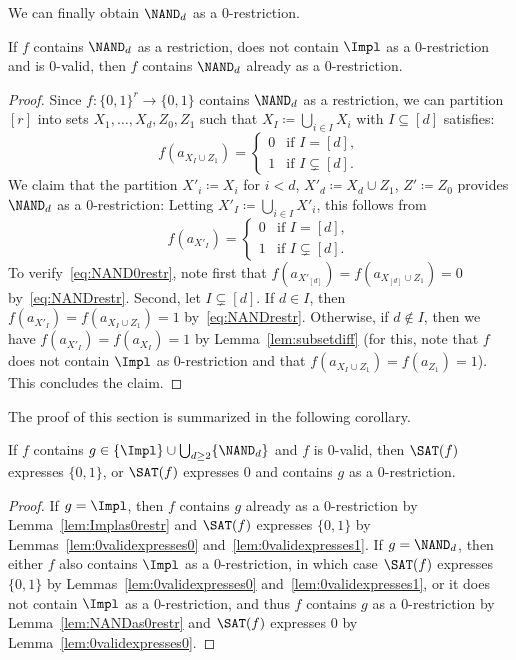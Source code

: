 %
We can finally obtain $\NAND_d$ as a $0$-restriction.
%
%
\begin{lem}\label{lem:NANDas0restr}
If $f$ contains $\NAND_d$ as a restriction, does not contain $\Impl$ as a 0-restriction and is $0$-valid, then $f$ contains $\NAND_d$ already as a $0$-restriction.
\end{lem}
\begin{proof}
%
%
%
%
%
%
%
%
%
%
%
%
%
%
%
%
%
%
%
%
%
%
%
%
%
%
%
%
%
%
%
%
%
%
%
%
%
%
%
%
%
%
%
%
Since $f:\{0,1\}^r \to \{0,1\}$ contains $\NAND_d$ as a restriction, we can partition $[r]$ into sets $X_1,\dots,X_d,Z_0,Z_1$ such that $X_I\coloneqq \bigcup_{i\in I} X_i$ with $I\subseteq [d]$ satisfies:
\begin{equation}\label{eq:NANDrestr}
f(a_{X_I \cup Z_1}) = \begin{cases} 0 & \text{if } I = [d], \\ 1 & \text{if } I \subsetneq [d]. \end{cases}
\end{equation}
%
We claim that the partition $X'_{i} \coloneqq X_i$ for $i<d$, $X'_d \coloneqq X_d \cup Z_1$, $Z'\coloneqq Z_0$ provides $\NAND_d$ as a 0-restriction: Letting $X'_I \coloneqq \bigcup_{i\in I} X'_i$, this follows from
\begin{equation}\label{eq:NAND0restr}
f(a_{X'_I}) = \begin{cases} 0 & \text{if } I = [d], \\ 1 & \text{if } I \subsetneq [d]. \end{cases}
\end{equation}
To verify~\eqref{eq:NAND0restr}, note first that $f(a_{X'_{[d]}}) = f(a_{X_{[d]}\cup Z_1}) = 0$ by~\eqref{eq:NANDrestr}. Second, let $I\subsetneq [d]$. If $d\in I$, then $f(a_{X'_I}) = f(a_{X_I\cup Z_1}) = 1$ by~\eqref{eq:NANDrestr}. Otherwise, if $d\notin I$, then we have $f(a_{X'_I}) = f(a_{X_I}) = 1$ by Lemma~\ref{lem:subsetdiff} (for this, note that $f$ does not contain $\Impl$ as 0-restriction and that $f(a_{X_I \cup Z_1}) = f(a_{Z_1}) = 1$). This concludes the claim.   
\end{proof}
%
The proof of this section is summarized in the following corollary. 
%
\begin{cor}\label{cor:0validfmainclaim}
If $f$ contains $g\in \{\Impl\} \cup \bigcup_{d\ge 2} \{\NAND_d\}$ and $f$ is $0$-valid, then $\SAT(f)$ expresses $\{0,1\}$, or $\SAT(f)$ expresses $0$ and contains $g$ as a $0$-restriction. 
\end{cor}
\begin{proof}
If $g=\Impl$, then $f$ contains $g$ already as a $0$-restriction by Lemma~\ref{lem:Implas0restr} and $\SAT(f)$ expresses $\{0,1\}$ by Lemmas~\ref{lem:0validexpresses0} and~\ref{lem:0validexpresses1}.
%
If $g=\NAND_d$, then either $f$ also contains $\Impl$ as a $0$-restriction, in which case $\SAT(f)$ expresses $\{0,1\}$ by Lemmas~\ref{lem:0validexpresses0} and~\ref{lem:0validexpresses1}, or it does not contain $\Impl$ as a $0$-restriction, and thus $f$ contains $g$ as a $0$-restriction by Lemma~\ref{lem:NANDas0restr} and $\SAT(f)$ expresses $0$ by Lemma~\ref{lem:0validexpresses0}.
\end{proof}
%
%
%
